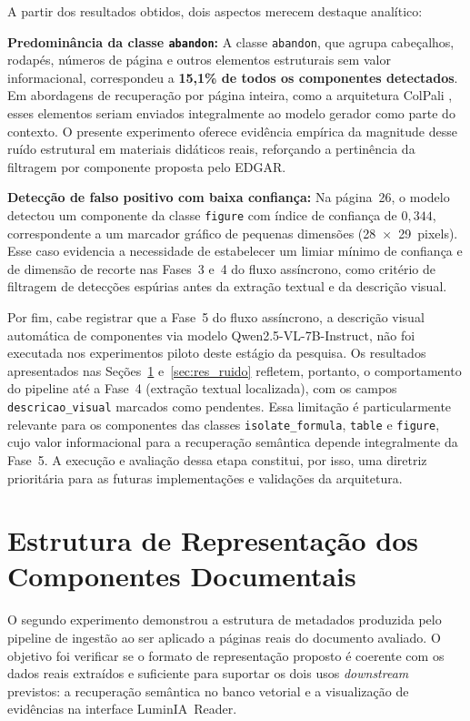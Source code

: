 A partir dos resultados obtidos, dois aspectos merecem destaque analítico:

\textbf{Predominância da classe \texttt{abandon}:} A classe
\texttt{abandon}, que agrupa cabeçalhos, rodapés, números de página e
outros elementos estruturais sem valor informacional, correspondeu a
\textbf{15,1\% de todos os componentes detectados}. Em abordagens de
recuperação por página inteira, como a arquitetura ColPali
, esses elementos seriam enviados integralmente
ao modelo gerador como parte do contexto. O presente experimento oferece
evidência empírica da magnitude desse ruído estrutural em materiais
didáticos reais, reforçando a pertinência da filtragem por componente
proposta pelo EDGAR.

\textbf{Detecção de falso positivo com baixa confiança:} Na página~26,
o modelo detectou um componente da classe \texttt{figure} com índice de
confiança de $0{,}344$, correspondente a um marcador gráfico de pequenas
dimensões (28~$\times$~29~pixels). Esse caso evidencia a necessidade de
estabelecer um limiar mínimo de confiança e de dimensão de recorte nas
Fases~3 e~4 do fluxo assíncrono, como critério de filtragem de
detecções espúrias antes da extração textual e da descrição visual.

Por fim, cabe registrar que a Fase~5 do fluxo assíncrono, a descrição visual
automática de componentes via modelo Qwen2.5-VL-7B-Instruct, não foi executada
nos experimentos piloto deste estágio da pesquisa. Os resultados apresentados
nas Seções~\ref{sec:res_meta} e~\ref{sec:res_ruido}
refletem, portanto, o comportamento do pipeline até a Fase~4 (extração textual
localizada), com os campos \texttt{descricao\_visual} marcados como pendentes.
Essa limitação é particularmente relevante para os componentes das classes
\texttt{isolate\_formula}, \texttt{table} e \texttt{figure}, cujo valor
informacional para a recuperação semântica depende integralmente da Fase~5.
A execução e avaliação dessa etapa constitui, por isso, uma diretriz prioritária 
para as futuras implementações e validações da arquitetura.

\section{Estrutura de Representação dos Componentes Documentais}
\label{sec:res_meta}

O segundo experimento demonstrou a estrutura de metadados produzida pelo
pipeline de ingestão ao ser aplicado a páginas reais do documento
avaliado. O objetivo foi verificar se o formato de representação
proposto é coerente com os dados reais extraídos e
suficiente para suportar os dois usos \textit{downstream} previstos:
a recuperação semântica no banco vetorial e a visualização de evidências
na interface LuminIA~Reader.

